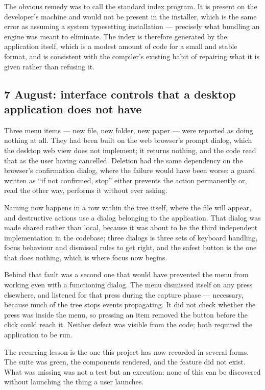 \documentclass[11pt,a4paper]{article}
\begin{document}
The obvious remedy was to call the standard index program. It is present on the
developer's machine and would not be present in the installer, which is the same
error as assuming a system typesetting installation --- precisely what bundling
an engine was meant to eliminate. The index is therefore generated by the
application itself, which is a modest amount of code for a small and stable
format, and is consistent with the compiler's existing habit of repairing what
it is given rather than refusing it.

\subsection{7 August: interface controls that a desktop application does not have}

Three menu items --- new file, new folder, new paper --- were reported as doing
nothing at all. They had been built on the web browser's prompt dialog, which
the desktop web view does not implement; it returns nothing, and the code read
that as the user having cancelled. Deletion had the same dependency on the
browser's confirmation dialog, where the failure would have been worse: a guard
written as ``if not confirmed, stop'' either prevents the action permanently or,
read the other way, performs it without ever asking.

Naming now happens in a row within the tree itself, where the file will appear,
and destructive actions use a dialog belonging to the application. That dialog
was made shared rather than local, because it was about to be the third
independent implementation in the codebase; three dialogs is three sets of
keyboard handling, focus behaviour and dismissal rules to get right, and the
safest button is the one that does nothing, which is where focus now begins.

Behind that fault was a second one that would have prevented the menu from
working even with a functioning dialog. The menu dismissed itself on any press
elsewhere, and listened for that press during the capture phase --- necessary,
because much of the tree stops events propagating. It did not check whether the
press was inside the menu, so pressing an item removed the button before the
click could reach it. Neither defect was visible from the code; both required
the application to be run.

The recurring lesson is the one this project has now recorded in several forms.
The suite was green, the components rendered, and the feature did not exist.
What was missing was not a test but an execution: none of this can be discovered
without launching the thing a user launches.
\end{document}
